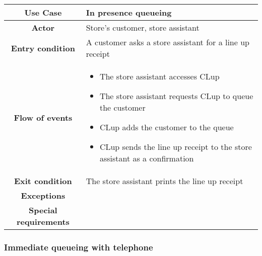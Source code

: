 \documentclass[../../main.tex]{subfiles}
\begin{document}
      \begin{table}[H]
        \centering
          \begin{tabular}{c m{}}
          \hline
          \textbf{Use Case} & In presence queueing\\ \hline
          \textbf{Actor} & Store's customer, store assistant\\ \hline
          \textbf{Entry condition} & A customer asks a store assistant for a line up receipt\\  \hline
          \textbf{Flow of events} & \begin{itemize}
                                      \item The store assistant accesses CLup
                                      \item The store assistant requests CLup to queue the customer
                                      \item CLup adds the customer to the queue
                                      \item CLup sends the line up receipt to the store assistant as a confirmation
                                    \end{itemize}\\ \hline
          \textbf{Exit condition} & The store assistant prints the line up receipt \\ \hline
          \textbf{Exceptions} & \\ \hline
          \textbf{Special requirements} &\\ \hline
          \end{tabular}
      \end{table}

      \subsubsection{Immediate queueing with telephone}
\end{document}
